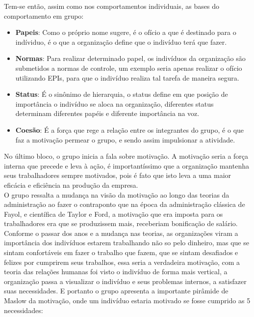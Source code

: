 \documentclass[oneside]{book}
\newcommand\tab[1][1cm]{\hspace*{#1}}
\theoremstyle{definition}
\begin{document}
        \tab Tem-se então, assim como nos comportamentos individuais, as bases do comportamento em grupo:
        \begin{itemize}
            \item \textbf{Papeis}: Como o próprio nome sugere, é o ofício a que é destinado para o indíviduo, é o que a organização define que o indivíduo terá que fazer.
            \item \textbf{Normas}: Para realizar determinado papel, os indivíduos da organização são submetidos a normas de controle, um exemplo seria apenas realizar o ofício utilizando EPIs, para que o indivíduo realiza tal tarefa de maneira segura.
            \item \textbf{Status}: É o sinônimo de hierarquia, o status define em que posição de importância o indivíduo se aloca na organização, diferentes status determinam diferentes papéis e diferente importância na voz.
            \item \textbf{Coesão}: É a força que rege a relação entre os integrantes do grupo, é o que faz a motivação permear o grupo, e sendo assim impulsionar a atividade.
        \end{itemize}
        \tab No último bloco, o grupo inicia a fala sobre motivação. A motivação seria a força interna que precede e leva à ação, é importantíssimo que a organização mantenha seus trabalhadores sempre motivados, pois é fato que isto leva a uma maior eficácia e eficiência na produção da empresa.\\
        \tab O grupo ressalta a mudança na visão da motivação ao longo das teorias da administração ao fazer o contraponto que na época da administração clássica de Fayol, e científica de Taylor e Ford, a motivação que era imposta para os trabalhadores era que se produzissem mais, receberiam bonificação de salário. Conforme o passar dos anos e a mudança nas teorias, as organizações viram a importância dos indivíduos estarem trabalhando não so pelo dinheiro, mas que se sintam confortáveis em fazer o trabalho que fazem, que se sintam desafiados e felizes por cumprirem seus trabalhos, essa seria a verdadeira motivação, com a teoria das relações humanas foi visto o indivíduo de forma mais vertical, a organização passa a visualizar o indivíduo e seus problemas internos, a satisfazer suas necessidades. E portanto o grupo apresenta a importante pirâmide de Maslow da motivação, onde um indivíduo estaria motivado se fosse cumprido as 5 necessidades:
\end{document}
